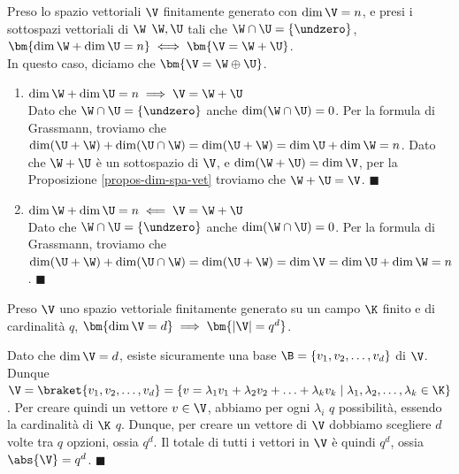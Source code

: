 \documentclass[11pt, a4paper, titlepage, oneside]{scrbook}
\begin{document}
\begin{Proposizione}[]
\label{propos-dim-spaz-vett-2}
Preso lo spazio vettoriali $\V$ finitamente generato con $\dim \V = n$, e presi i sottospazi vettoriali di $\W$ $\W, \U$ tali che $\W \cap \U = \{\undzero\}$, $\bm{\dim \W + \dim \U = n} \iff \bm{\V = \W + \U}$. \\
In questo caso, diciamo che $\bm{\V = \W \oplus \U}$.
\end{Proposizione}

\Dimostrazione \nopagebreak

\begin{enumerate}[label=\arabic*°]
    \item $\dim \W + \dim \U = n \implies \V = \W + \U$ \\
    Dato che $\W \cap \U = \{\undzero\}$ anche $\dim (\W \cap \U) = 0$. Per la formula di Grassmann, troviamo che $\dim (\U + \W) + \dim (\U \cap \W) = \dim (\U + \W) = \dim \U + \dim \W = n$. Dato che $\W + \U$ è un sottospazio di $\V$, e $\dim (\W + \U) = \dim \V$, per la Proposizione \ref{propos-dim-spa-vet} troviamo che $\W + \U = \V$. $\blacksquare$ 
    \item $\dim \W + \dim \U = n \impliedby \V = \W + \U$ \\
    Dato che $\W \cap \U = \{\undzero\}$ anche $\dim (\W \cap \U) = 0$. Per la formula di Grassmann, troviamo che $\dim (\U + \W) + \dim (\U \cap \W) = \dim (\U + \W) = \dim \V = \dim \U + \dim \W = n$. $\blacksquare$
\end{enumerate}

\begin{Osservazione}[]
\label{oss-dim-spaz-vett}
Preso $\V$ uno spazio vettoriale finitamente generato su un campo $\K$ finito e di cardinalità $q$, $\bm{\dim \V  = d} \implies \bm{\lvert \V \rvert = q^d}$.
\end{Osservazione}

\Dimostrazione \nopagebreak

Dato che $\dim \V = d$, esiste sicuramente una base $\B = \{v_1, v_2, \ldots, v_d\}$ di $\V$. Dunque \mbox{$\V = \braket{v_1, v_2, \ldots, v_d} =\{v = \lambda_1 v_1 + \lambda_2 v_2 + \ldots + \lambda_k v_k \mid \lambda_1, \lambda_2, \ldots, \lambda_k \in \K\}$}. Per creare quindi un vettore $v \in \V$, abbiamo per ogni $\lambda_i$ $q$ possibilità, essendo la cardinalità di $\K$ $q$. Dunque, per creare un vettore di $\V$ dobbiamo scegliere $d$ volte tra $q$ opzioni, ossia $q^d$. Il totale di tutti i vettori in $\V$ è quindi $q^d$, ossia $\abs{\V} = q^d$. $\blacksquare$  
\end{document}

